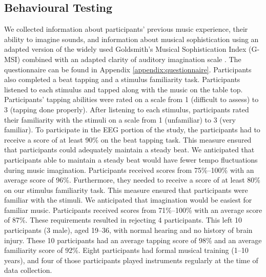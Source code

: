 \subsection{Behavioural Testing}
We collected information about participants' previous music experience, their ability to imagine sounds, and information about musical sophistication using an adapted version of the widely used Goldsmith's Musical Sophistication Index (G-MSI) \cite{mullensiefen_musicality_2014} combined with an adapted clarity of auditory imagination scale \cite{willander_imagery_scale_2010}. 
The questionnaire can be found in Appendix \ref{appendix:questionnaire}.
Participants also completed a beat tapping and a stimulus familiarity task. 
Participants listened to each stimulus and tapped along with the music on the table top. 
Participants'  tapping abilities were rated on a scale from 1 (difficult to assess) to 3 (tapping done properly). 
After listening to each stimulus, participants rated their familiarity with the stimuli on a scale from 1 (unfamiliar) to 3 (very familiar).
To participate in the \ac{EEG} portion of the study, the participants had to receive a score of at least 90\% on the beat tapping task.
This measure ensured that participants could adequately maintain a steady beat.
We anticipated that participants able to maintain a steady beat would have fewer tempo fluctuations during music imagination.
Participants received scores from 75\%--100\% with an average score of 96\%.
Furthermore, they needed to receive a score of at least 80\% on our stimulus familiarity task. 
This measure ensured that participants were familiar with the stimuli.
We anticipated that imagination would be easiest for familiar music.
Participants received scores from 71\%--100\% with an average score of 87\%.
These requirements resulted in rejecting 4 participants.
This left 10 participants (3 male), aged 19--36, with normal hearing and no history of brain injury. 
These 10 participants had an average tapping score of 98\% and an average familiarity score of 92\%.
Eight participants had formal musical training (1--10 years), and four of those participants played instruments regularly at the time of data collection.


